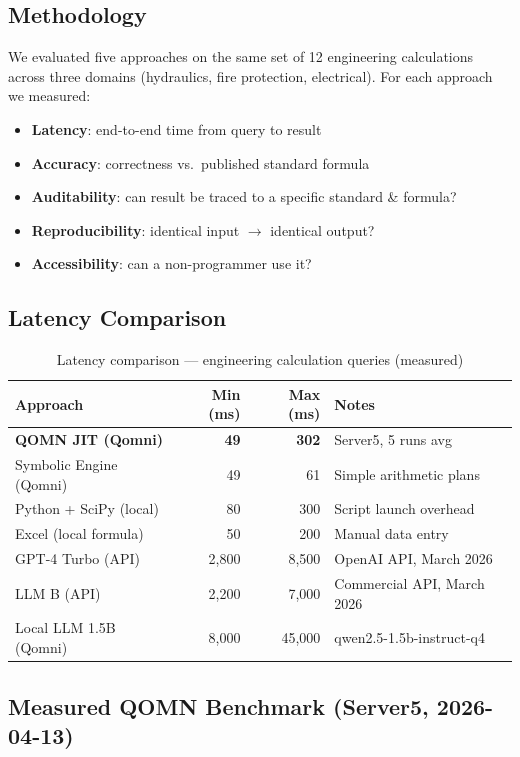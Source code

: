 \documentclass[12pt,a4paper]{article}
\begin{document}
\subsection{Methodology}

We evaluated five approaches on the same set of 12 engineering calculations
across three domains (hydraulics, fire protection, electrical).
For each approach we measured:
\begin{itemize}
  \item \textbf{Latency}: end-to-end time from query to result
  \item \textbf{Accuracy}: correctness vs.\ published standard formula
  \item \textbf{Auditability}: can result be traced to a specific standard \& formula?
  \item \textbf{Reproducibility}: identical input $\to$ identical output?
  \item \textbf{Accessibility}: can a non-programmer use it?
\end{itemize}

\subsection{Latency Comparison}

\begin{table}[h]
\centering
\caption{Latency comparison — engineering calculation queries (measured)}
\begin{tabular}{lrrl}
\toprule
Approach & Min (ms) & Max (ms) & Notes \\
\midrule
\textbf{QOMN JIT (Qomni)} & \textbf{49} & \textbf{302} & Server5, 5 runs avg \\
Symbolic Engine (Qomni) & 49 & 61 & Simple arithmetic plans \\
Python + SciPy (local) & 80 & 300 & Script launch overhead \\
Excel (local formula) & 50 & 200 & Manual data entry \\
GPT-4 Turbo (API) & 2,800 & 8,500 & OpenAI API, March 2026 \\
LLM B (API) & 2,200 & 7,000 & Commercial API, March 2026 \\
Local LLM 1.5B (Qomni) & 8,000 & 45,000 & qwen2.5-1.5b-instruct-q4 \\
\bottomrule
\end{tabular}
\end{table}

\subsection{Measured QOMN Benchmark (Server5, 2026-04-13)}
\end{document}
